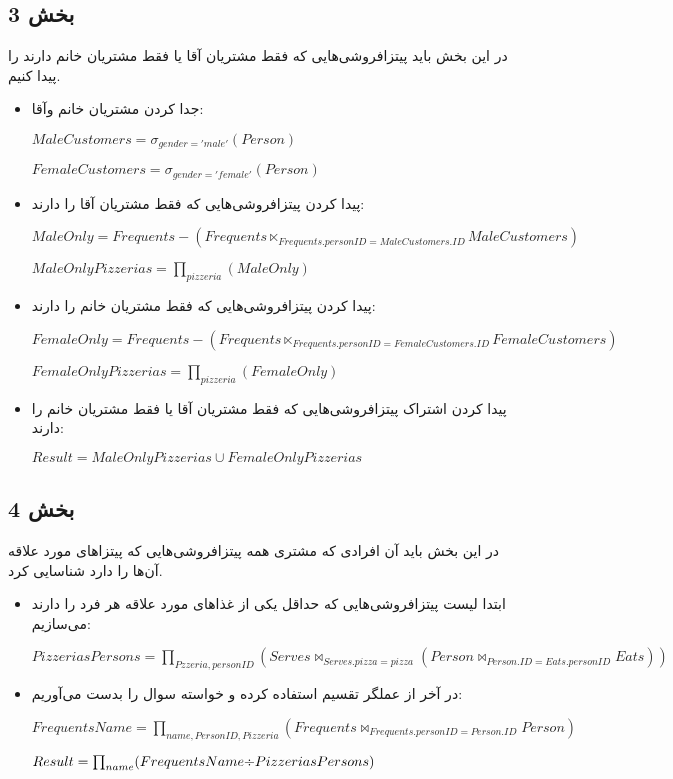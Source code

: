 \subsection*{بخش 3}
در این بخش باید پیتزافروشی‌هایی که فقط مشتریان آقا یا فقط مشتریان خانم دارند را پیدا کنیم.
\begin{itemize}	
	\item جدا کردن مشتریان خانم وآقا:
	
	\setLTR
	$MaleCustomers = \sigma_{gender = 'male'} (Person)$
	
	$FemaleCustomers = \sigma_{gender = 'female'} (Person)$
	\setRTL
	
	\item پیدا کردن پیتزافروشی‌هایی که فقط مشتریان آقا را دارند:
	
		\setLTR
$MaleOnly = Frequents - (Frequents \ltimes_{Frequents.personID=MaleCustomers.ID} MaleCustomers)$

$MaleOnlyPizzerias = \prod_{pizzeria} (MaleOnly)$
	\setRTL
	
		\item پیدا کردن پیتزافروشی‌هایی که فقط مشتریان خانم را دارند:
	
	\setLTR
	$FemaleOnly = Frequents - (Frequents \ltimes_{Frequents.personID=FemaleCustomers.ID} FemaleCustomers)$
	
	$FemaleOnlyPizzerias = \prod_{pizzeria} (FemaleOnly)$
	\setRTL
	
	\item پیدا کردن اشتراک پیتزافروشی‌هایی که فقط مشتریان آقا یا فقط مشتریان خانم را دارند:
	
		\setLTR
	$Result = MaleOnlyPizzerias \cup FemaleOnlyPizzerias$
	\setRTL
	
	
\end{itemize}

\subsection*{بخش 4}
در این بخش باید آن افرادی که مشتری همه پیتزافروشی‌هایی که پیتزاهای مورد علاقه آن‌ها را دارد شناسایی کرد.
\begin{itemize}	
		\item
		ابتدا لیست پیتزافروشی‌هایی که حداقل یکی از غذاهای مورد علاقه هر فرد را دارند می‌سازیم:
		
	
	\setLTR
	$PizzeriasPersons =\prod_{Pzzeria,personID} (Serves \bowtie_{Serves.pizza = pizza}({Person \bowtie_{Person.ID=Eats.personID}Eats}))$
	\setRTL

	
	\item 
	در آخر از عملگر تقسیم استفاده کرده و خواسته سوال را بدست می‌آوریم:
	
	\setLTR
	$FrequentsName = \prod_{name,PersonID,Pizzeria}({Frequents \bowtie_{Frequents.personID=Person.ID} Person})$
	
	$Result = \prod_{name}(FrequentsName  \text{\textdiv}  PizzeriasPersons)$
	\setRTL
\end{itemize}

